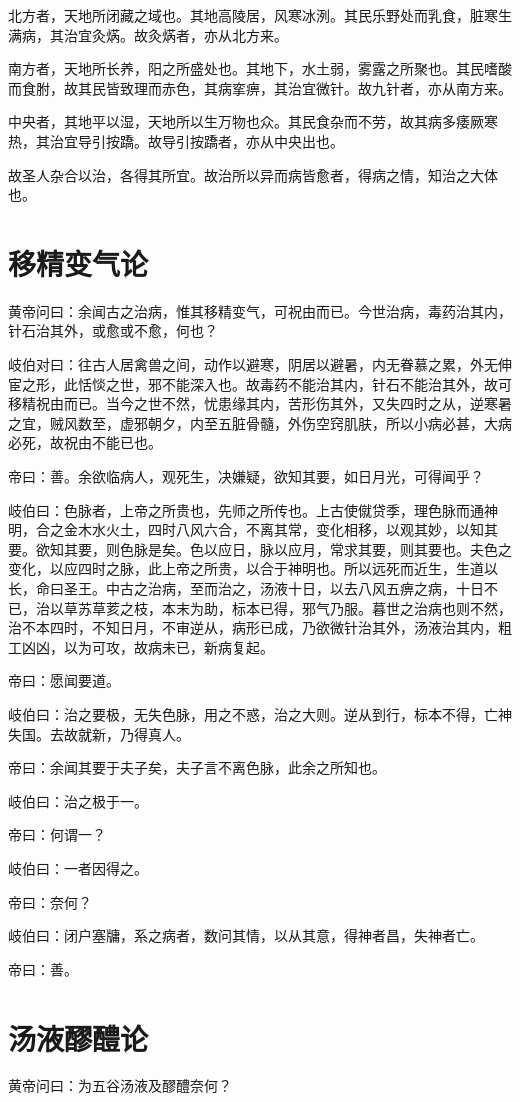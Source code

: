 \documentclass{article}%
\begin{document}
北方者，天地所闭藏之域也。其地高陵居，风寒冰洌。其民乐野处而乳食，脏寒生满病，其治宜灸焫。故灸焫者，亦从北方来。

南方者，天地所长养，阳之所盛处也。其地下，水土弱，雾露之所聚也。其民嗜酸而食胕，故其民皆致理而赤色，其病挛痹，其治宜微针。故九针者，亦从南方来。

中央者，其地平以湿，天地所以生万物也众。其民食杂而不劳，故其病多痿厥寒热，其治宜导引按蹻。故导引按蹻者，亦从中央出也。

故圣人杂合以治，各得其所宜。故治所以异而病皆愈者，得病之情，知治之大体也。
\section{移精变气论}
黄帝问曰：余闻古之治病，惟其移精变气，可祝由而已。今世治病，毒药治其内，针石治其外，或愈或不愈，何也？

岐伯对曰：往古人居禽兽之间，动作以避寒，阴居以避暑，内无眷慕之累，外无伸宦之形，此恬惔之世，邪不能深入也。故毒药不能治其内，针石不能治其外，故可移精祝由而已。当今之世不然，忧患缘其内，苦形伤其外，又失四时之从，逆寒暑之宜，贼风数至，虚邪朝夕，内至五脏骨髓，外伤空窍肌肤，所以小病必甚，大病必死，故祝由不能已也。

帝曰：善。余欲临病人，观死生，决嫌疑，欲知其要，如日月光，可得闻乎？

岐伯曰：色脉者，上帝之所贵也，先师之所传也。上古使僦贷季，理色脉而通神明，合之金木水火土，四时八风六合，不离其常，变化相移，以观其妙，以知其要。欲知其要，则色脉是矣。色以应日，脉以应月，常求其要，则其要也。夫色之变化，以应四时之脉，此上帝之所贵，以合于神明也。所以远死而近生，生道以长，命曰圣王。中古之治病，至而治之，汤液十日，以去八风五痹之病，十日不已，治以草苏草荄之枝，本末为助，标本已得，邪气乃服。暮世之治病也则不然，治不本四时，不知日月，不审逆从，病形已成，乃欲微针治其外，汤液治其内，粗工凶凶，以为可攻，故病未已，新病复起。

帝曰：愿闻要道。

岐伯曰：治之要极，无失色脉，用之不惑，治之大则。逆从到行，标本不得，亡神失国。去故就新，乃得真人。

帝曰：余闻其要于夫子矣，夫子言不离色脉，此余之所知也。

岐伯曰：治之极于一。

帝曰：何谓一？

岐伯曰：一者因得之。

帝曰：奈何？

岐伯曰：闭户塞牗，系之病者，数问其情，以从其意，得神者昌，失神者亡。

帝曰：善。
\section{汤液醪醴论}
黄帝问曰：为五谷汤液及醪醴奈何？
\end{document}
